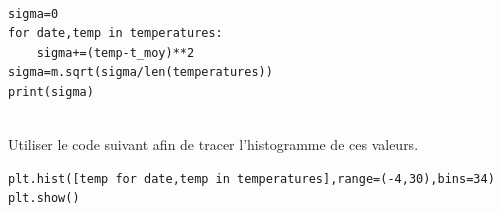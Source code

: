 \begin{solution}~\ \\
\begin{verbatim}
sigma=0
for date,temp in temperatures:
    sigma+=(temp-t_moy)**2
sigma=m.sqrt(sigma/len(temperatures))
print(sigma)
\end{verbatim}
\end{solution}

\begin{exercice}~\\
Utiliser le code suivant afin de tracer l'histogramme de ces valeurs.
\end{exercice}

\begin{verbatim}
plt.hist([temp for date,temp in temperatures],range=(-4,30),bins=34)
plt.show()
\end{verbatim}


